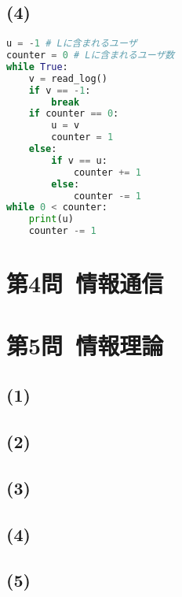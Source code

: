 \documentclass[a4paper,12pt,xelatex,ja=standard]{bxjsarticle}
\begin{document}
\subsection*{(4)}
\begin{lstlisting}[language=Python]
u = -1 # Lに含まれるユーザ
counter = 0 # Lに含まれるユーザ数
while True:
    v = read_log()
    if v == -1:
        break
    if counter == 0:
        u = v
        counter = 1
    else:
        if v == u:
            counter += 1
        else:
            counter -= 1
while 0 < counter:
    print(u)
    counter -= 1
\end{lstlisting}

\section*{第4問\ 情報通信}

\section*{第5問\ 情報理論}
\subsection*{(1)}

\subsection*{(2)}

\subsection*{(3)}

\subsection*{(4)}

\subsection*{(5)}
\end{document}
